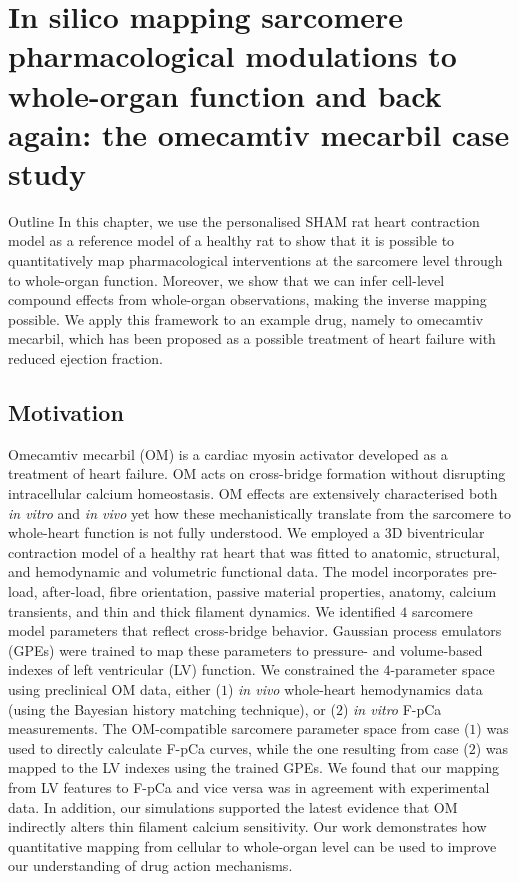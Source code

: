 \chapter{In silico mapping sarcomere pharmacological modulations to whole-organ function and back again: the omecamtiv mecarbil case study}\label{cha:chapter5}
%
%
%
\begin{remark}{Outline}
    In this chapter, we use the personalised SHAM rat heart contraction model as a reference model of a healthy rat to show that it is possible to quantitatively map pharmacological interventions at the sarcomere level through to whole-organ function. Moreover, we show that we can infer cell-level compound effects from whole-organ observations, making the inverse mapping possible. We apply this framework to an example drug, namely to omecamtiv mecarbil, which has been proposed as a possible treatment of heart failure with reduced ejection fraction.
\end{remark}


%
%
%
\section{Motivation}\label{sec:ch5motivation}

\noindent
Omecamtiv mecarbil (OM) is a cardiac myosin activator developed as a treatment of heart failure. OM acts on cross-bridge formation without disrupting intracellular calcium homeostasis. OM effects are extensively characterised both \textit{in vitro} and \textit{in vivo} yet how these mechanistically translate from the sarcomere to whole-heart function is not fully understood. We employed a $3$D biventricular contraction model of a healthy rat heart that was fitted to anatomic, structural, and hemodynamic and volumetric functional data. The model incorporates pre-load, after-load, fibre orientation, passive material properties, anatomy, calcium transients, and thin and thick filament dynamics. We identified $4$ sarcomere model parameters that reflect cross-bridge behavior. Gaussian process emulators (GPEs) were trained to map these parameters to pressure- and volume-based indexes of left ventricular (LV) function. We constrained the $4$-parameter space using preclinical OM data, either ($1$) \textit{in vivo} whole-heart hemodynamics data (using the Bayesian history matching technique), or ($2$) \textit{in vitro} F-pCa measurements. The OM-compatible sarcomere parameter space from case ($1$) was used to directly calculate F-pCa curves, while the one resulting from case ($2$) was mapped to the LV indexes using the trained GPEs. We found that our mapping from LV features to F-pCa and vice versa was in agreement with experimental data. In addition, our simulations supported the latest evidence that OM indirectly alters thin filament calcium sensitivity. Our work demonstrates how quantitative mapping from cellular to whole-organ level can be used to improve our understanding of drug action mechanisms.

